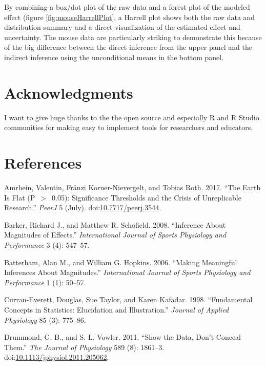 \documentclass[fleqn,10pt,lineno]{wlpeerj} %
\theoremstyle{definition}
\theoremstyle{definition}
\theoremstyle{definition}
\theoremstyle{remark}
\begin{document}
By combining a box/dot plot of the raw data and a forest plot of the
modeled effect (figure \ref{fig:mouseHarrellPlot}, a Harrell plot shows
both the raw data and distribution summary and a direct visualization of
the estimated effect and uncertainty. The mouse data are particularly
striking to demonstrate this because of the big difference between the
direct inference from the upper panel and the indirect inference using
the unconditional means in the bottom panel.

\section*{Acknowledgments}\label{acknowledgments}

I want to give huge thanks to the the open source and especially R and R
Studio communities for making easy to implement tools for researchers
and educators.

\newpage

\section*{References}\label{references}

\hypertarget{refs}{}
\hypertarget{ref-Amrhein_earth_2017b}{}
Amrhein, Valentin, Fränzi Korner-Nievergelt, and Tobias Roth. 2017.
``The Earth Is Flat (P~\(>\)~0.05): Significance Thresholds and the
Crisis of Unreplicable Research.'' \emph{PeerJ} 5 (July).
doi:\href{https://doi.org/10.7717/peerj.3544}{10.7717/peerj.3544}.

\hypertarget{ref-Barker_Inference_2008}{}
Barker, Richard J., and Matthew R. Schofield. 2008. ``Inference About
Magnitudes of Effects.'' \emph{International Journal of Sports
Physiology and Performance} 3 (4): 547--57.

\hypertarget{ref-Batterham_Making_2006}{}
Batterham, Alan M., and William G. Hopkins. 2006. ``Making Meaningful
Inferences About Magnitudes.'' \emph{International Journal of Sports
Physiology and Performance} 1 (1): 50--57.

\hypertarget{ref-Curran-Everett_Fundamental_1998}{}
Curran-Everett, Douglas, Sue Taylor, and Karen Kafadar. 1998.
``Fundamental Concepts in Statistics: Elucidation and Illustration.''
\emph{Journal of Applied Physiology} 85 (3): 775--86.

\hypertarget{ref-Drummond_Show_2011}{}
Drummond, G. B., and S. L. Vowler. 2011. ``Show the Data, Don't Conceal
Them.'' \emph{The Journal of Physiology} 589 (8): 1861--3.
doi:\href{https://doi.org/10.1113/jphysiol.2011.205062}{10.1113/jphysiol.2011.205062}.
\end{document}

